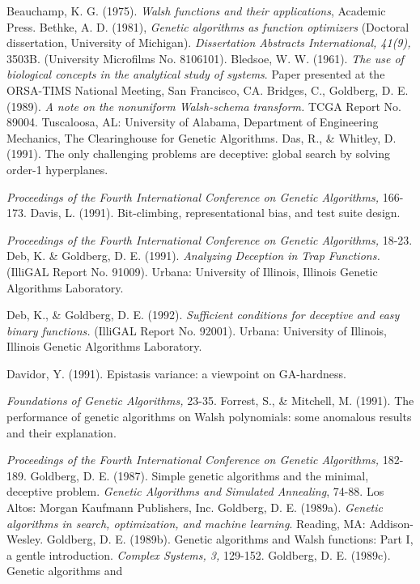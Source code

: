 \typeout{}
\newcommand{\icgafour}{
	{\em Proceedings of the Fourth International Conference
	on Genetic Algorithms,} }
\newcommand{\illigal}[1]
	{(IlliGAL Report No. #1).
	Urbana: University of Illinois, Illinois Genetic Algorithms Laboratory.
	}
\newcommand{\foga}{
	{\em Foundations of Genetic Algorithms,}
}

\begin{thereferences}
 Beauchamp, K. G. (1975). {\em Walsh functions and their 
	applications}, Academic Press.
 Bethke, A. D. (1981), {\em Genetic algorithms as function 
	optimizers} (Doctoral dissertation, University of Michigan).
	{\em Dissertation Abstracts International, 41(9),} 3503B.
	(University Microfilms No. 8106101).
 Bledsoe, W. W. (1961). {\em The use of biological 
	concepts in the
	analytical study of systems}. Paper presented at the ORSA-TIMS
	National Meeting, San Francisco, CA.
 Bridges, C., Goldberg, D. E. (1989).
	{\em A note on the nonuniform Walsh-schema transform.}
	TCGA Report No. 89004.
	Tuscaloosa, AL: University of Alabama, Department of Engineering
	Mechanics, The Clearinghouse for Genetic Algorithms.
 Das, R., \& Whitley, D. (1991).
	The only challenging problems are deceptive:
	global search by solving order-1 hyperplanes.
	\icgafour 166-173.
 Davis, L. (1991).
	Bit-climbing, representational bias, and test suite design.
	\icgafour 18-23.
 Deb, K. \& Goldberg, D. E. (1991).
	{\em Analyzing Deception in Trap Functions.}
	\illigal{91009}
 Deb, K., \& Goldberg, D. E. (1992).
	{\em Sufficient conditions for
	deceptive and easy binary functions.} 
	\illigal{92001}
 Davidor, Y. (1991).
	Epistasis variance: a viewpoint on GA-hardness.
	\foga 23-35.
 Forrest, S., \& Mitchell, M. (1991).
	The performance of genetic algorithms on Walsh polynomials:
	some anomalous results and their explanation.
	\icgafour 182-189.
 Goldberg, D. E. (1987). Simple genetic algorithms and the
	minimal, deceptive problem. {\em Genetic Algorithms and Simulated
	Annealing}, 74-88.  Los Altos: Morgan Kaufmann Publishers, Inc.
 Goldberg, D. E. (1989a). {\em Genetic algorithms in search,
	optimization, and machine learning}. Reading, MA: Addison-Wesley.
 Goldberg, D. E. (1989b).  Genetic algorithms and
	Walsh functions: Part I, a gentle introduction. {\em Complex
	Systems, 3,} 129-152.
 Goldberg, D. E. (1989c).  Genetic algorithms and

\end{thereferences}
